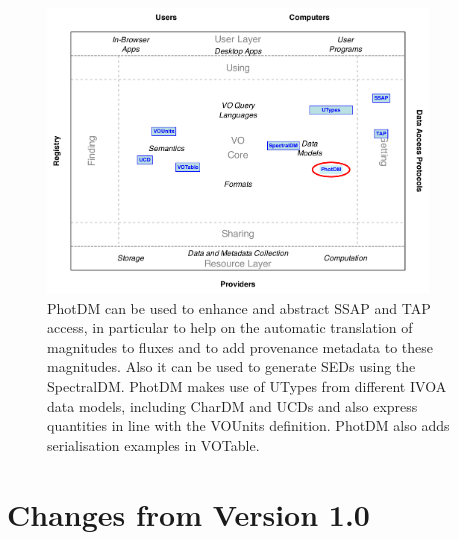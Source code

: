 \documentclass[11pt,a4paper]{ivoa}
\begin{document}
\begin{figure}[H]
\centering


\includegraphics[width=0.9\textwidth]{role_diagram.pdf}
\caption{PhotDM can be used to enhance and abstract SSAP and TAP access, in particular
to help on the automatic translation of magnitudes to fluxes and to add provenance
metadata to these magnitudes. Also it can be used to generate SEDs using the SpectralDM.
PhotDM makes use of UTypes from different IVOA data models, including CharDM and UCDs and
also express quantities in line with the VOUnits definition.
PhotDM also adds serialisation examples in VOTable.
}
\label{fig:archdiag}
\end{figure}

\section*{Changes from Version 1.0} \label{changesTable}

\end{document}
